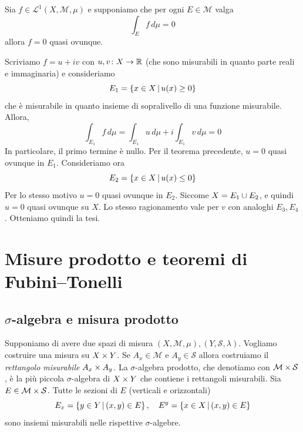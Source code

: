 \documentclass[a4paper]{article}
\begin{document}
\begin{radioactive}
\begin{snippettheorem}{}
    Sia \(f \in \mathcal L^1(X,\mathcal M,\mu)\)
    e supponiamo che per ogni \(E \in \mathcal M\) valga \[
        \int_E f\,d\mu = 0
    \]
    allora \(f=0\) quasi ovunque.
\end{snippettheorem}
\end{radioactive}

\begin{radioactive}
\begin{snippetproof}{}
    Scriviamo \(f = u+iv\) con \(u,v \colon X \to \mathbb{R}\)
    (che sono misurabili in quanto parte reali e immaginaria) e consideriamo
    \[
        E_1 = \left\{
            x \in X \,|\, u(x) \geq 0
        \right\}
    \]
    che è misurabile in quanto insieme di sopralivello di una funzione misurabile.
    Allora, \[
        \int_{E_1} f\,d\mu =
        \int_{E_1}u\,d\mu + i\int_{E_1}v\,d\mu = 0
    \]
    In particolare, il primo termine è nullo.
    Per il teorema precedente, \(u = 0\) quasi ovunque in \(E_1\). Consideriamo ora \[
        E_2 = \left\{
            x \in X \,|\, u(x) \leq 0
        \right\}
    \]
    Per lo stesso motivo \(u=0\) quasi ovunque in \(E_2\).
    Siccome \(X = E_1 \cup E_2\), e quindi \(u = 0\) quasi ovunque su \(X\).
    Lo stesso ragionamento vale per \(v\) con analoghi \(E_3, E_4\).
    Otteniamo quindi la tesi.
\end{snippetproof}
\end{radioactive}

\pagebreak

\section{Misure prodotto e teoremi di Fubini--Tonelli}

\subsection{\(\sigma\)-algebra e misura prodotto}

\begin{radioactive}
Supponiamo di avere due spazi di misura \((X, \mathcal M, \mu), (Y, \mathcal S, \lambda)\).
Vogliamo costruire una misura su \(X \times Y\).
Se \(A_x \in \mathcal M\) e \(A_y \in \mathcal S\) allora costruiamo il \emph{rettangolo misurabile}
\(A_x \times A_y\).
La \(\sigma\)-algebra prodotto, che denotiamo con \(\mathcal M \times \mathcal S\),
è la più piccola \(\sigma\)-algebra di \(X \times Y\)
che contiene i rettangoli misurabili.
Sia \(E \in \mathcal M \times \mathcal S\).
Tutte le sezioni di \(E\) (verticali e orizzontali)
\[
    E_x = \left\{
        y \in Y \,|\, (x,y) \in E
    \right\}, \quad
    E^y = \left\{
        x \in X \,|\, (x,y) \in E
    \right\}
\]
sono insiemi misurabili nelle rispettive \(\sigma\)-algebre.
\end{radioactive}
\end{document}
